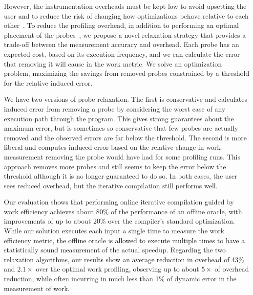     However, the instrumentation overheads must be kept low to avoid upsetting the user and to reduce the risk
    of changing how optimizations behave relative to each other~\cite{forman81,anderson97,duesterwald00}.
    To reduce the profiling overhead, in addition to performing an optimal placement of the probes~\cite{knuth73,forman81,ball94}, we propose a novel
    relaxation strategy that provides a trade-off between the measurement accuracy and overhead.
    Each probe has an expected cost, based on its execution frequency, and we can calculate the error that removing it will cause in the work metric.
    We solve an optimization problem, maximizing the savings from removed probes constrained by a threshold for the relative induced error.

    We have two versions of probe relaxation. The first is conservative and calculates induced error from removing a probe by considering
    the worst case of any execution path through the program. This gives strong guarantees about the maximum error, but is sometimes so
    conservative that few probes are actually removed and the observed errors are far below the threshold. The second is more liberal and
    computes induced error based on the relative change in work measurement removing the probe would have had for some profiling runs. This
    approach removes more probes and still seems to keep the error below the threshold although it is no longer guaranteed to do so. In
    both cases, the user sees reduced overhead, but the iterative compilation still performs well.

    Our evaluation shows that performing online iterative compilation guided by work efficiency achieves about 80\% of the performance of
    an offline oracle, with improvements of up to about 20\% over the compiler's standard optimization. While our solution executes each
    input a single time to measure the work efficiency metric, the offline oracle is allowed to execute multiple times to have a
    statistically sound measurement of the actual speedup. Regarding the two relaxation algorithms, our results show an average reduction
    in overhead of 43\% and $2.1\times$ over the optimal work profiling, observing up to about $5\times$ of overhead reduction, while often
    incurring in much less than 1\% of dynamic error in the measurement of work.

